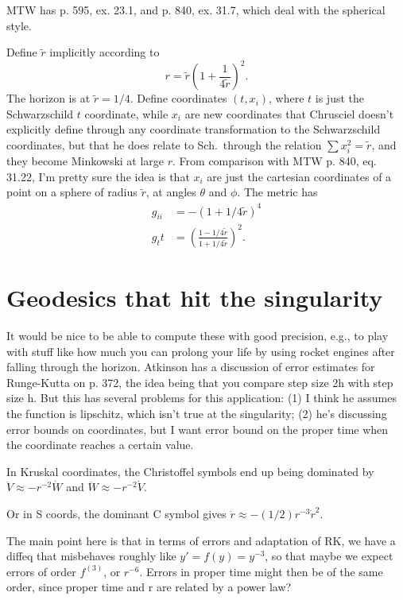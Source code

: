 \documentclass{article}
\begin{document}
MTW has p. 595, ex. 23.1, and p. 840, ex. 31.7, which deal with the spherical style.

Define $\tilde{r}$ implicitly according to
\begin{equation}
  r = \tilde{r}\left(1+\frac{1}{4\tilde{r}}\right)^2.
\end{equation}
The horizon is at $\tilde{r}=1/4$. Define coordinates $(t,x_i)$, where $t$ is
just the Schwarzschild $t$ coordinate, while $x_i$ are new coordinates that Chrusciel doesn't
explicitly define through any coordinate transformation to the Schwarzschild coordinates,
but that he does relate to Sch.~through the relation $\sum x_i^2=\tilde{r}$, and they
become Minkowski at large $r$. From comparison with MTW p. 840, eq. 31.22, I'm pretty
sure the idea is that $x_i$ are just the cartesian coordinates of a point on a sphere
of radius $\tilde{r}$, at angles $\theta$ and $\phi$. The metric has
\begin{align}
  g_{ii} &= -(1+1/4\tilde{r})^4 \\
  g_tt &= \left(\frac{1-1/4\tilde{r}}{1+1/4\tilde{r}}\right)^2.
\end{align}

\section{Geodesics that hit the singularity}

It would be nice to be able to compute these with good precision, e.g., to play with
stuff like how much you can prolong your life by using rocket engines after falling
through the horizon. Atkinson has a discussion of error estimates for Runge-Kutta on
p. 372, the idea being that you compare step size 2h with step size h. But this has
several problems for this application: (1) I think he assumes the function is lipschitz,
which isn't true at the singularity; (2) he's discussing error bounds on coordinates,
but I want error bound on the proper time when the coordinate reaches a certain value.

In Kruskal coordinates, the Christoffel symbols end up being dominated by
$\ddot{V}\approx -r^{-2}\dot{W}$ and $\ddot{W}\approx -r^{-2}\dot{V}$.

Or in S coords, the dominant C symbol gives $\ddot{r}\approx -(1/2)r^{-3}\dot{r}^2$.

The main point here is that in terms of errors and adaptation of RK,
we have a diffeq that misbehaves roughly like $y'=f(y)=y^{-3}$, so that
maybe we expect errors of order $f^{(3)}$, or $r^{-6}$. Errors in proper
time might then be of the same order, since proper time and r are related
by a power law?
\end{document}
